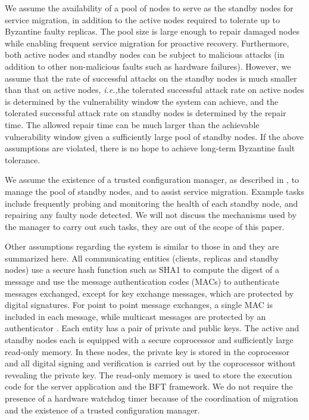 \documentclass[times, 10pt, twocolumn]{article}
\newcommand{\ie}{{\it i.e.,}}
\begin{document}
We assume the availability of a pool of nodes to serve as the standby
nodes for service migration, in addition to the  active nodes required 
to tolerate up to  Byzantine faulty replicas. The pool size is large enough
to repair damaged nodes while enabling frequent service
migration for proactive recovery. Furthermore, both active nodes
and standby nodes can be subject to malicious attacks (in addition
to other non-malicious faults such as hardware failures). However,
we assume that the rate of successful attacks on the standby nodes
is much smaller than that on active nodes, \ie the tolerated
successful attack rate on active nodes is determined by the 
vulnerability window the system can achieve, and the tolerated 
successful attack rate on standby nodes is determined by the repair
time. The allowed repair time can be much larger than the
achievable vulnerability window given a sufficiently large pool of standby
nodes. If the above assumptions are violated,
there is no hope to achieve long-term Byzantine fault tolerance.

We assume the existence of a trusted configuration manager, as described in
\cite{rosebud,bftlls}, to manage the pool of standby nodes, and to assist 
service migration. Example tasks include
frequently probing and monitoring the health of each standby node, and 
repairing any faulty node detected.
We will not discuss the mechanisms used by the manager to carry out
such tasks, they are out of the scope of this paper. 

Other assumptions regarding the system is similar to those in \cite{bft-acm}
and they are summarized here. All communicating entities (clients,
replicas and standby nodes) use a secure hash function such as SHA1 to compute
the digest of a message and use the message authentication codes (MACs)
to authenticate messages exchanged, except for key exchange messages, which
are protected by digital signatures. For point to point message exchanges,
a single MAC is included in each message, while multicast messages are
protected by an authenticator \cite{authenticator}. Each entity has a pair 
of private and public keys. The active and standby nodes each is equipped with
a secure coprocessor and sufficiently large read-only memory. In these
nodes, the private key is stored in the coprocessor and all digital
signing and verification is carried out by the coprocessor without revealing
the private key. The read-only memory is used to store the execution code
for the server application and the BFT framework. We do not require the 
presence of a hardware watchdog timer because of the coordination of 
migration and the existence of a trusted configuration manager.
\end{document}
